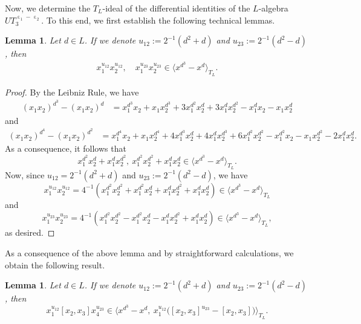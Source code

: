 \documentclass[a4paper,reqno]{amsart}
\newtheorem{lemma}[theorem]{Lemma}
\theoremstyle{definition}
\numberwithin{equation}{section}
\numberwithin{theorem}{section}
\DeclareMathOperator{\e}{\varepsilon}
\begin{document}
Now, we determine the $T_L$-ideal of the differential identities of the $L$-algebra $UT_3^{\e_1-\e_2}.$ To this end, we first establish the following technical lemmas.
\begin{lemma}\label{lem: cons IdUT3e1-e2 1}
    Let $d\in L$. If we denote $u_{12}:=2^{-1}(d^2+d)$ and $u_{23}:=2^{-1}(d^2-d)$, then 
    \begin{equation*}
        \begin{split}
          x_1^{u_{12}} x_2^{u_{12}}, \quad x_1^{u_{23}} x_2^{u_{23}} \in \langle x^{d^3}-x^{d}\rangle_{T_L}.
        \end{split}
    \end{equation*}
\end{lemma}
\begin{proof}
    By the Leibniz Rule, we have
    \begin{align*}
        (x_1x_2)^{d^3} -(x_1x_2)^d&=x_1^{d^3}x_2+ x_1 x_2^{d^3}+ 3x_1^{d^2}x_2^d + 3 x_1^{d}x_2^{d^2}-x_1^dx_2-x_1x_2^d
    \end{align*}
    and
    \begin{align*}
        (x_1x_2)^{d^4}  -(x_1x_2)^{d^2} & =x_1^{d^4}x_2+ x_1 x_2^{d^4}+ 4x_1^{d^3}x_2^d + 4 x_1^{d}x_2^{d^3}+ 6x_1^{d^2}x_2^{d^2}-x_1^{d^2}x_2-x_1x_2^{d^2}-2x_1^dx_2^d.
    \end{align*}
    As a consequence, it follows that 
    $$x_1^{d^2}x_2^d + x_1^{d}x_2^{d^2}, \ x_1^{d^2}x_2^{d^2}+x_1^dx_2^d \in \langle x^{d^3}-x^{d}\rangle_{T_L}.$$
    Now, since $u_{12}=2^{-1}(d^2+d)$ and $u_{23}:=2^{-1}(d^2-d)$, we have
    $$
     x_1^{u_{12}} x_2^{u_{12}}
    =4^{-1}( x_1^{d^2}x_2^{d^2} + x_1^{d^2}x_2^{d}+x_1^{d}x_2^{d^2}+ x_1^{d}x_2^{d})\in \langle x^{d^3}-x^{d}\rangle_{T_L}
    $$
    and
    $$
    x_1^{u_{23}} x_2^{u_{23}} 
    =4^{-1}( x_1^{d^2}x_2^{d^2} - x_1^{d^2}x_2^{d}-x_1^{d}x_2^{d^2}+ x_1^{d}x_2^{d})\in \langle x^{d^3}-x^{d}\rangle_{T_L},
    $$
    as desired.
\end{proof}


As a consequence of the above lemma and by straightforward calculations, we obtain the following result.

\begin{lemma}\label{lem: cons IdUT3e1-e2 4}
     Let $d\in L$. If we denote $u_{12}:=2^{-1}(d^2+d)$ and $u_{23}:=2^{-1}(d^2-d)$, then 
     $$ x_1^{u_{12}}[x_2,x_3]x_4^{u_{23}} \in \langle x^{d^3}-x^{d}, \ x_1^{u_{12}} \big([x_2,x_3]^{u_{23}}-[x_2,x_3]\big) \rangle_{T_L}.$$
\end{lemma}
\end{document}
